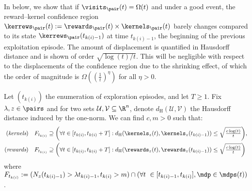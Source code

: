 \documentclass[preprint,cleveref,12pt]{colt2025}
\DeclarePairedDelimiter{\parens}{(}{)}	%
\def\model{\mdp}
\def\models{\mdps}
\begin{document}
    In  below, we show that if $\visits_\pair (t) = \Omega(t)$ and under a good event, the reward--kernel confidence region $\kerrews_\pair (t) := \rewards_\pair (t) \times \kernels_\pair (t)$ barely changes compared to its state $\kerrews_\pair (t_{k(i)-1})$ at time $t_{k(i)-1}$, the beginning of the previous exploitation episode. 
    The amount of displacement is quantified in Hausdorff distance and is shown of order $\sqrt{\log(t)/t}$.
    This will be negligible with respect to the displacements of the confidence region due to the shrinking effect, of which the order of magnitude is $\Omega((\frac 1t)^\eta)$ for all $\eta > 0$.

    \begin{lemma}
    \label{lemma_shaking}
        Let $(t_{k(i)})$ the enumeration of exploration episodes, and let $T \ge 1$.
        Fix $\lambda, z \in \pairs$ and for two sets $\mathcal{U}, \mathcal{V} \subseteq \R^n$, denote $d_\mathrm{H}(\mathcal{U}, \mathcal{V})$ the Hausdorff distance induced by the one-norm. 
        We can find $c, m > 0$ such that:
        \begin{align*}
            \parens*{\textit{kernels}} \quad
            & F_{t_{k(i)}} \supseteq 
            \parens*{
                \forall t \in [{t_{k(i)}}, {t_{k(i)}}+T]: d_\mathrm{H}(\kernels_z(t), \kernels_z({t_{k(i)-1}})) 
                \le 
                \sqrt{\tfrac {c \log(t)}t}
            }, 
            \\
            \parens*{\textit{rewards}} \quad
            & F_{t_{k(i)}} \supseteq 
            \parens*{
                \forall t \in [{t_{k(i)}}, {t_{k(i)}}+T]: d_\mathrm{H}(\rewards_z(t), \rewards_z({t_{k(i)-1}})) 
                \le 
                \sqrt{\tfrac {c \log(t)}t}
            }
        \end{align*}
        where $F_{t_{k(i)}} := (N_z({t_{k(i)-1}}) > \lambda {t_{k(i)-1}}, {t_{k(i)}} > m) \cap (\forall t \in [t_{k(i)-1}, t_{k(i)}], \model \in \models(t))$.
    \end{lemma}
\end{document}
